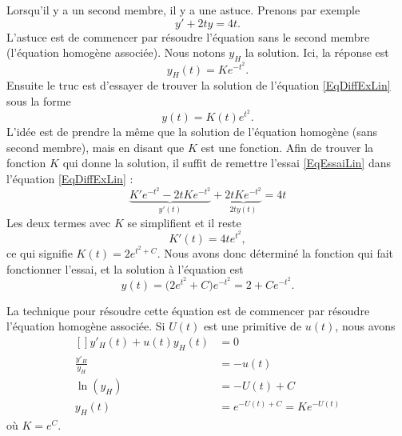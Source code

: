 \begin{example}

	Lorsqu'il y a un second membre, il y a une astuce. Prenons par exemple
	\begin{equation}		\label{EqDiffExLin}
		y'+2ty=4t.
	\end{equation}
	L'astuce est de commencer par résoudre l'équation sans le second membre (l'équation homogène associée). Nous notons \( y_H\) la solution. Ici, la réponse est
	\begin{equation}
		y_H(t)=K e^{-t^2}.
	\end{equation}
	Ensuite le truc est d'essayer de trouver la solution de l'équation \eqref{EqDiffExLin} sous la forme
	\begin{equation}		\label{EqEssaiLin}
		y(t)=K(t) e^{t^2}.
	\end{equation}
	L'idée est de prendre la même que la solution de l'équation homogène (sans second membre), mais en disant que \( K\) est une fonction. Afin de trouver la fonction \( K\) qui donne la solution, il suffit de remettre l'essai \eqref{EqEssaiLin} dans l'équation \eqref{EqDiffExLin} :
	\begin{equation}
		\underbrace{K' e^{-t^2}-2tK e^{-t^2}}_{y'(t)}+\underbrace{2tK e^{-t^2}}_{2ty(t)}=4t
	\end{equation}
	Les deux termes avec \( K\) se simplifient et il reste
	\begin{equation}
		K'(t)=4t e^{t^2},
	\end{equation}
	ce qui signifie \( K(t)=2 e^{t^2+C}\). Nous avons donc déterminé la fonction qui fait fonctionner l'essai, et la solution à l'équation est
	\begin{equation}
		y(t)=\big( 2 e^{t^2}+C \big) e^{-t^2}=2+C e^{-t^2}.
	\end{equation}
\end{example}

La technique pour résoudre cette équation est de commencer par résoudre l'équation homogène associée. Si \( U(t)\) est une primitive de \( u(t)\), nous avons
\begin{equation}
	\begin{aligned}[]
		y'_H(t)+u(t)y_H(t)   & =0                        \\
		\frac{ y'_H }{ y_H } & =-u(t)                    \\
		\ln(y_H)             & =-U(t)+C                  \\
		y_H(t)               & = e^{-U(t)+C}=K e^{-U(t)}
	\end{aligned}
\end{equation}
où \( K= e^{C}\).

